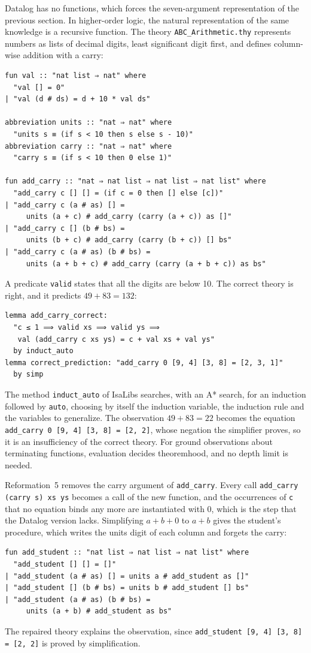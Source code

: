\documentclass[preprint,12pt]{elsarticle}
\newcommand{\isa}[1]{\texttt{#1}}
\begin{document}
Datalog has no functions, which forces the seven-argument representation
of the previous section. In higher-order logic, the natural representation
of the same knowledge is a recursive function. The theory
\isa{ABC\_Arithmetic.thy} represents numbers as lists of decimal digits,
least significant digit first, and defines column-wise addition with a
carry:
\begin{lstlisting}
fun val :: "nat list ⇒ nat" where
  "val [] = 0"
| "val (d # ds) = d + 10 * val ds"

abbreviation units :: "nat ⇒ nat" where
  "units s ≡ (if s < 10 then s else s - 10)"
abbreviation carry :: "nat ⇒ nat" where
  "carry s ≡ (if s < 10 then 0 else 1)"

fun add_carry :: "nat ⇒ nat list ⇒ nat list ⇒ nat list" where
  "add_carry c [] [] = (if c = 0 then [] else [c])"
| "add_carry c (a # as) [] =
     units (a + c) # add_carry (carry (a + c)) as []"
| "add_carry c [] (b # bs) =
     units (b + c) # add_carry (carry (b + c)) [] bs"
| "add_carry c (a # as) (b # bs) =
     units (a + b + c) # add_carry (carry (a + b + c)) as bs"
\end{lstlisting}
A predicate \isa{valid} states that all the digits are below 10. The
correct theory is right, and it predicts $49 + 83 = 132$:
\begin{lstlisting}
lemma add_carry_correct:
  "c ≤ 1 ⟹ valid xs ⟹ valid ys ⟹
   val (add_carry c xs ys) = c + val xs + val ys"
  by induct_auto
lemma correct_prediction: "add_carry 0 [9, 4] [3, 8] = [2, 3, 1]"
  by simp
\end{lstlisting}
The method \isa{induct\_auto} of IsaLibs searches, with an A* search, for
an induction followed by \isa{auto}, choosing by itself the induction
variable, the induction rule and the variables to generalize. The observation $49 + 83 = 22$ becomes the equation
\isa{add\_carry 0 [9, 4] [3, 8] = [2, 2]}, whose negation the simplifier
proves, so it is an insufficiency of the correct theory. For ground
observations about terminating functions, evaluation decides theoremhood,
and no depth limit is needed.

Reformation~5 removes the carry argument of \isa{add\_carry}. Every call
\isa{add\_carry (carry s) xs ys} becomes a call of the new function, and the
occurrences of \isa{c} that no equation binds any more are instantiated
with 0, which is the step that the Datalog version lacks. Simplifying
$a + b + 0$ to $a + b$ gives the student's procedure, which writes the
units digit of each column and forgets the carry:
\begin{lstlisting}
fun add_student :: "nat list ⇒ nat list ⇒ nat list" where
  "add_student [] [] = []"
| "add_student (a # as) [] = units a # add_student as []"
| "add_student [] (b # bs) = units b # add_student [] bs"
| "add_student (a # as) (b # bs) =
     units (a + b) # add_student as bs"
\end{lstlisting}
The repaired theory explains the observation, since
\isa{add\_student [9, 4] [3, 8] = [2, 2]} is proved by simplification.
\end{document}
